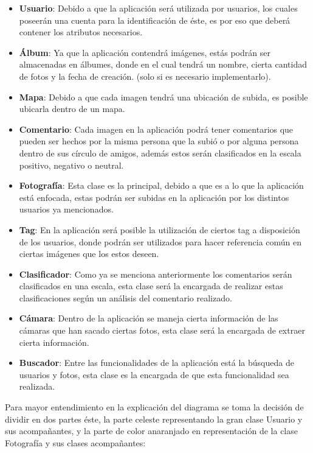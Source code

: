 \documentclass{memoria}
\begin{document}
\begin{itemize}
    \item \textbf{Usuario}: Debido a que la aplicación será utilizada por usuarios, los cuales poseerán una cuenta para la identificación de éste, es por eso que deberá contener los atributos necesarios. 
    \item \textbf{Álbum}: Ya que la aplicación contendrá imágenes, estás podrán ser almacenadas en álbumes, donde en el cual tendrá un nombre, cierta cantidad de fotos y la fecha de creación. (solo si es necesario implementarlo).
    \item \textbf{Mapa}: Debido a que cada imagen tendrá una ubicación de subida, es posible ubicarla dentro de un mapa.
    \item \textbf{Comentario}: Cada imagen en la aplicación podrá tener comentarios que pueden ser hechos por la misma persona que la subió o por alguna persona dentro de sus círculo de amigos, además estos serán clasificados en la escala positivo, negativo o neutral.
    \item \textbf{Fotografía}: Esta clase es la principal, debido a que es a lo que la aplicación está enfocada, estas podrán ser subidas en la aplicación por los distintos usuarios ya mencionados.
    \item \textbf{Tag}: En la aplicación será posible la utilización de ciertos tag a disposición de los usuarios, donde podrán ser utilizados para hacer referencia común en ciertas imágenes que los estos deseen.
    \item \textbf{Clasificador}: Como ya se menciona anteriormente los comentarios serán clasificados en una escala, esta clase será la encargada de realizar estas clasificaciones según un análisis del comentario realizado.
    \item \textbf{Cámara}: Dentro de la aplicación se maneja cierta información de las cámaras que han sacado ciertas fotos, esta clase será la encargada de extraer cierta información.
    \item \textbf{Buscador}: Entre las funcionalidades de la aplicación está la búsqueda de usuarios y fotos, esta clase es la encargada de que esta funcionalidad sea realizada.   
\end{itemize}


\newpage

Para mayor entendimiento en la explicación del diagrama se toma la decisión de dividir en dos partes éste, la parte celeste representando la gran clase Usuario y sus acompañantes, y la parte de color anaranjado en representación de la clase Fotografía y sus clases acompañantes:
\end{document}
